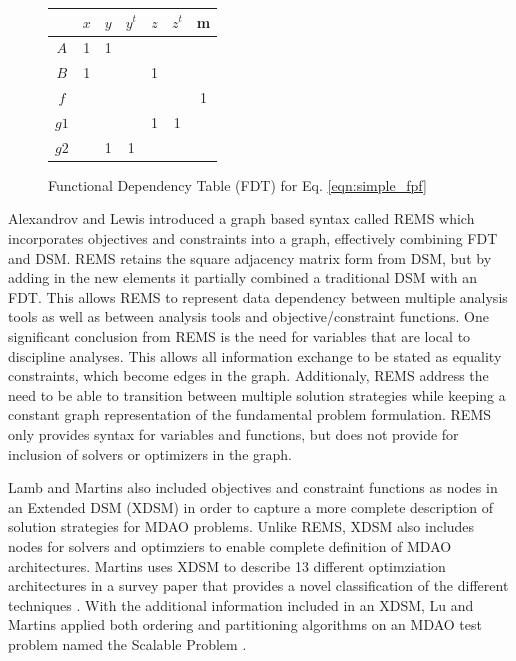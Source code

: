     \begin{figure}
        \begin{center}
        \begin{tabular}{|c|c|c|c|c|c|c|}
            \hline
                 & $x$ & $y$ & $y^t$ & $z$ & $z^t$ & m \\ \hline
            $A$  & 1  & 1    &       &     &       &   \\ \hline
            $B$  & 1  &      &       & 1   &       &   \\ \hline
            $f$  &    &      &       &     &       & 1 \\ \hline
            $g1$ &    &      &       & 1   & 1     &   \\ \hline
            $g2$ &    & 1    & 1     &     &       &   \\
            \hline
        \end{tabular}
        \caption{Functional Dependency Table (FDT) for Eq. \ref{eqn:simple_fpf} \label{fig:FDT_simple}}
        \end{center}
    \end{figure}

    Alexandrov and Lewis introduced a graph based syntax called REMS which 
    incorporates objectives and constraints into a graph, effectively combining 
    FDT and DSM\cite{alexandrov2004}. REMS retains the square adjacency 
    matrix form from DSM, but by adding in the new elements it partially 
    combined a traditional DSM with an FDT. This allows REMS to represent data 
    dependency between multiple analysis tools as well as between analysis tools and
    objective/constraint functions. One significant conclusion from REMS is 
    the need for variables that are local to discipline analyses. This allows 
    all information exchange to be stated as equality constraints, which become 
    edges in the graph. Additionaly, REMS address the need to be able to 
    transition between multiple solution strategies while keeping a constant 
    graph representation of the fundamental problem formulation. REMS only provides
    syntax for variables and functions, but does not provide for inclusion 
    of solvers or optimizers in the graph. 

    Lamb and Martins also included objectives and constraint functions as nodes in an Extended 
    DSM (XDSM) in order to capture a more complete description of solution strategies for MDAO problems\cite{Lambe2012}. 
    Unlike REMS, XDSM also includes nodes for solvers and optimziers to enable complete definition of 
    MDAO architectures. Martins uses XDSM to describe 13 different optimziation architectures in 
    a survey paper that provides a novel classification of the different 
    techniques \cite{Lambe2011}. With the additional information included in an 
    XDSM, Lu and Martins applied both ordering and partitioning algorithms on an 
    MDAO test problem named the Scalable Problem \cite{Lu2012}. 

